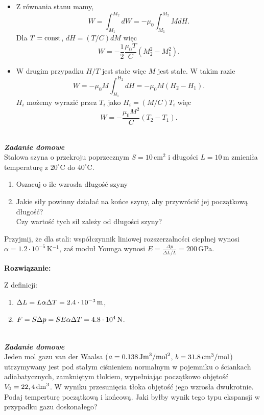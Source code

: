 \documentclass[11pt,a4paper]{article}
\newcounter{zaddom}\newcommand{\zaddom}[1][]{\addtocounter{zaddom}{1} ~\\  {\bf \emph{Zadanie domowe \arabic{zaddom} #1 }} \\}
\begin{document}
\begin{itemize}
\item Z równania stanu mamy, 
\begin{equation}
	W = \int_{M_1}^{M_2} dW = - \mu_0 \int_{M_1}^{M_2} M dH.
\end{equation}	
Dla $T={\rm const}$, $dH = (T/C) dM$ więc 
\begin{equation}
	W = - \frac{1}{2} \frac{\mu_0 T}{C} \left(M_2^2 - M_1^2 \right).
\end{equation} 
\item W drugim przypadku $H/T$ jest stałe więc $M$ jest stałe. W takim razie 
\begin{equation}
	W = - \mu_0 M \int_{H_1}^{H_2} dH = - \mu_0 M (H_2 - H_1).
\end{equation}
$H_i$ możemy wyrazić przez $T_i$ jako $H_i = (M/C) T_i$ więc 
\begin{equation}
	W = - \frac{\mu_0 M^2}{C} (T_2 - T_1).
\end{equation}

\end{itemize}
\newpage
\zaddom
Stalowa szyna o przekroju poprzecznym $S = 10\,$cm$^2$ i długości $L = 10\,$m zmieniła temperaturę
z $20^\circ$C do $40^\circ$C.
\begin{enumerate}
\item Oszacuj o ile wzrosła długość szyny
\item Jakie siły powinny działać na końce szyny, aby przywrócić jej początkową długość? \\
      Czy wartość tych sił zależy od długości szyny?
\end{enumerate}
Przyjmij, że dla stali: współczynnik liniowej rozszerzalności cieplnej wynosi $\alpha = 1.2\cdot 10^{-5}\,$K$^{-1}$,
zaś moduł Younga wynosi $\displaystyle E = \frac{\Delta p}{\Delta L/L} = 200\,$GPa.

\vskip 10pt
\textbf{Rozwiązanie:}

Z definicji:
\begin{enumerate}
\item $\Delta L = L \alpha \Delta T = 2.4 \cdot 10^{-3}\, {\rm m}$,
\item $F = S \Delta p = S E \alpha \Delta T = 4.8 \cdot 10^4\, {\rm N}$.
\end{enumerate}
\newpage
\zaddom
Jeden mol gazu van der Waalsa ($a=0.138\,\rm{Jm}^3/\rm{mol}^2$, $b=31.8\,\rm{cm^3/mol}$)
utrzymywany jest pod stałym ciśnieniem normalnym w pojemniku o ściankach adiabatycznych, zamkniętym tłokiem,
wypełniając początkowo objętość $V_0=22,4\,\rm{dm}^3$.
W wyniku przesunięcia tłoka objętość jego wzrosła dwukrotnie. Podaj temperturę początkową i końcową.  
Jaki byłby wynik tego typu ekspansji w przypadku gazu doskonałego?
\end{document}
